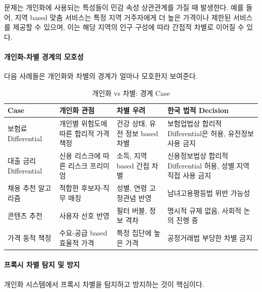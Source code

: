 문제는 개인화에 사용되는 특성들이 민감 속성 상관관계를 가질 때 발생한다. 
예를 들어, 지역 based 맞춤 서비스는 특정 지역 거주자에게 
더 높은 가격이나 제한된 서비스를 제공할 수 있으며, 
이는 해당 지역의 인구 구성에 따라 간접적 차별로 이어질 수 있다.


\paragraph{개인화-차별 경계의 모호성}

다음 사례들은 개인화와 차별의 경계가 얼마나 모호한지 보여준다.

\begin{table}[htbp]
\centering
\caption{개인화 vs 차별: 경계 Case}
\label{tab:personalization_discrimination}
\begin{tabular}{p{3cm}p{4cm}p{3cm}p{4cm}}
\toprule
\textbf{Case} & \textbf{개인화 관점} & \textbf{차별 우려} & \textbf{한국 법적 Decision} \\
\midrule
보험료 Differential & 
개인별 위험도에 따른 합리적 가격 책정 & 
건강 상태, 유전 정보 based 차별 & 
보험업법상 합리적 Differential은 허용, 유전정보 사용 금지 \\
\midrule
대출 금리 Differential & 
신용 리스크에 따른 리스크 프리미엄 & 
소득, 지역 based 간접 차별 & 
신용정보법상 합리적 Differential 허용, 성별.지역 직접 사용 금지 \\
\midrule
채용 추천 알고리즘 & 
적합한 후보자-직무 매칭 & 
성별, 연령 고정관념 반영 & 
남녀고용평등법 위반 가능성 \\
\midrule
콘텐츠 추천 & 
사용자 선호 반영 & 
필터 버블, 정보 격차 & 
명시적 규제 없음, 사회적 논의 진행 중 \\
\midrule
가격 동적 책정 & 
수요-공급 based 효율적 가격 & 
특정 집단에 높은 가격 & 
공정거래법 부당한 차별 금지 \\
\bottomrule
\end{tabular}
\end{table}


\paragraph{프록시 차별 탐지 및 방지}

개인화 시스템에서 프록시 차별을 탐지하고 방지하는 것이 핵심이다.


